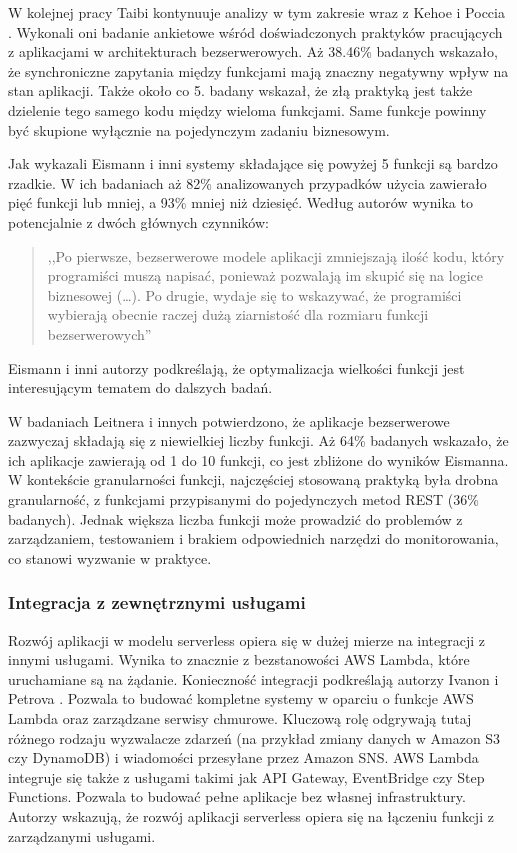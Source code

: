W kolejnej pracy Taibi kontynuuje analizy w tym zakresie wraz z Kehoe i Poccia \cite{9912641}. 
Wykonali oni badanie ankietowe wśród doświadczonych praktyków pracujących z aplikacjami w architekturach bezserwerowych.
Aż 38.46\% badanych wskazało, że synchroniczne zapytania między funkcjami mają znaczny negatywny wpływ na stan aplikacji.
Także około co 5. badany wskazał, że złą praktyką jest także dzielenie tego samego kodu między wieloma funkcjami.
Same funkcje powinny być skupione wyłącznie na pojedynczym zadaniu biznesowym.

Jak wykazali Eismann i inni \cite{eismann2021reviewserverlessusecases} systemy składające się powyżej 5 funkcji są bardzo rzadkie.
W ich badaniach aż 82\% analizowanych przypadków użycia zawierało pięć funkcji lub mniej, a 93\% mniej niż dziesięć. 
Według autorów wynika to potencjalnie z dwóch głównych czynników:
\begin{quote}
    ,,Po pierwsze, bezserwerowe modele aplikacji zmniejszają ilość kodu, który programiści muszą napisać, ponieważ pozwalają im skupić się na logice biznesowej (\dots). Po drugie, wydaje się to wskazywać, że programiści wybierają obecnie raczej dużą ziarnistość dla rozmiaru funkcji bezserwerowych'' \cite{eismann2021reviewserverlessusecases}
\end{quote}
Eismann i inni autorzy podkreślają, że optymalizacja wielkości funkcji jest interesującym tematem do dalszych badań.

W badaniach Leitnera i innych \cite{LEITNER2019340} potwierdzono, że aplikacje bezserwerowe zazwyczaj składają się z niewielkiej liczby funkcji.
Aż 64\% badanych wskazało, że ich aplikacje zawierają od 1 do 10 funkcji, co jest zbliżone do wyników Eismanna.
W kontekście granularności funkcji, najczęściej stosowaną praktyką była drobna granularność, z funkcjami przypisanymi do pojedynczych metod REST (36\% badanych).
Jednak większa liczba funkcji może prowadzić do problemów z zarządzaniem, testowaniem i brakiem odpowiednich narzędzi do monitorowania, co stanowi wyzwanie w praktyce.

\subsubsection*{Integracja z zewnętrznymi usługami}

Rozwój aplikacji w modelu serverless opiera się w dużej mierze na integracji z innymi usługami.
Wynika to znacznie z bezstanowości AWS Lambda, które uruchamiane są na żądanie.
Konieczność integracji podkreślają autorzy Ivanon i Petrova \cite{Ivanov_Petrova_2024}.
Pozwala to budować kompletne systemy w oparciu o funkcje AWS Lambda oraz zarządzane serwisy chmurowe.
Kluczową rolę odgrywają tutaj różnego rodzaju wyzwalacze zdarzeń (na przykład zmiany danych w Amazon S3 czy DynamoDB) i wiadomości przesyłane przez Amazon SNS.
AWS Lambda integruje się także z usługami takimi jak API Gateway, EventBridge czy Step Functions.
Pozwala to budować pełne aplikacje bez własnej infrastruktury.
Autorzy wskazują, że rozwój aplikacji serverless opiera się na łączeniu funkcji z zarządzanymi usługami.

